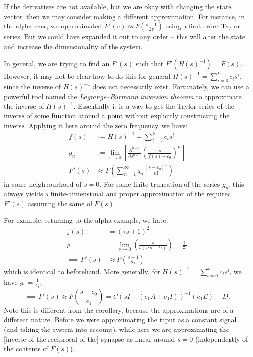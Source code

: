 If the derivatives are not available, but we are okay with changing the state vector, then we may consider making a different approximation.
For instance, in the alpha case, we approximated $F'(s) \approx F \left( \frac{s-1}{2\tau} \right)$ using a first-order Taylor series.
But we could have expanded it out to any order -- this will alter the state and increase the dimensionality of the system.

In general, we are trying to find an $F'(s)$ such that $F'(H(s)^{-1}) = F(s)$.
However, it may not be clear how to do this for general $H(s)^{-1} = \sum_{i=0}^k c_i s^i$, since the inverse of $H(s)^{-1}$ does not necessarily exist.
Fortunately, we can use a powerful tool named the {\it Lagrange--B\"urmann inversion theorem} to approximate the inverse of $H(s)^{-1}$.
Essentially it is a way to get the Taylor series of the inverse of some function around a point without explicitly constructing the inverse. Applying it here around the zero frequency, we have:
\begin{align}
f(s) &:= H(s)^{-1} = \sum_{i=0}^k c_i s^i \nonumber \\
g_n &:= \lim_{s \rightarrow 0} \left[ \frac{\partial^{n-1}}{\partial s^{n-1}} \left( \frac{s}{f(s) - c_0} \right)^n \right] \nonumber \\
F'(s) &\approx F \left( \sum_{n=1}^\infty g_n \frac{(s - c_0)^n}{n!} \right)
\end{align}
in some neighbourhood of $s = 0$.
For some finite truncation of the series $g_n$, this always yields a finite-dimensional and proper approximation of the required $F'(s)$ assuming the same of $F(s)$.

For example, returning to the alpha example, we have:
\begin{align*}
f(s) &= (\tau s + 1)^2 \\
g_1 &= \lim_{s \rightarrow 0} \left( \frac{s}{ s(\tau^2 s + 2 \tau)} \right) = \frac{1}{2 \tau} \\
\implies F'(s) &\approx F \left( \frac{s - 1}{2\tau} \right)
\end{align*}
which is identical to beforehand.
More generally, for $H(s)^{-1} = \sum_{i=0}^k c_i s^i$, we have $g_1 = \frac{1}{c_1}$,
\begin{equation}
\implies F'(s) \approx F \left( \frac{s - c_0}{c_1} \right) = C \left( sI - (c_1 A + c_0 I) \right)^{-1} (c_1 B) + D.
\end{equation}
Note this is different from the corollary, because the approximations are of a different nature. Before we were approximating the input as a constant signal (and taking the system into account), while here we are approximating the [inverse of the reciprocal of the] synapse as linear around $s = 0$ (independently of the contents of $F(s)$).

